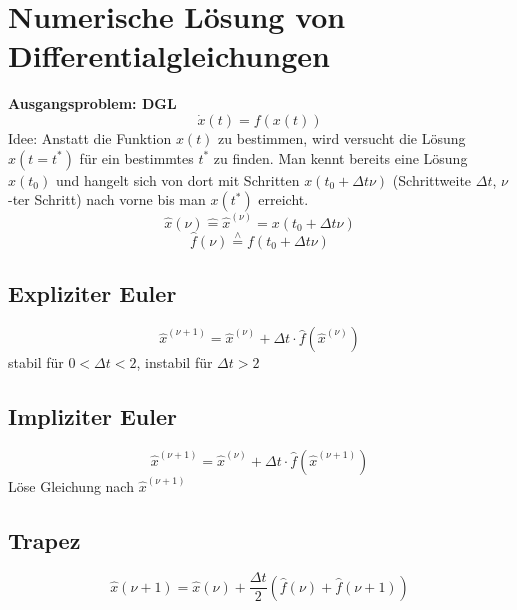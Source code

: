 \documentclass[german]{latex4ei/latex4ei_sheet}
\begin{document}
\section{Numerische Lösung von Differentialgleichungen}
\begin{sectionbox}
\textbf{Ausgangsproblem: DGL}
\begin{equation*}
	\dot{x}(t) = f(x(t))
\end{equation*}
Idee: Anstatt die Funktion $x(t)$ zu bestimmen, wird versucht die Lösung $x(t=t^*)$ für ein bestimmtes $t^*$ zu finden. Man kennt bereits eine Lösung $x(t_0)$ und hangelt sich von dort mit Schritten $x(t_0 + Δtν)$ (Schrittweite $\Delta t$, $ν$-ter Schritt) nach vorne bis man $x(t^*)$ erreicht.
\begin{equation*}
	\hat{x}(\nu) \hat{=} \hat{x}^{(\nu)} = x(t_0 + \Delta t \nu)
\end{equation*}
\begin{equation*}
	\hat{f}(\nu) \stackrel{\wedge}{=} f(t_0 + \Delta t \nu)
\end{equation*}


\subsection{Expliziter Euler}
\begin{equation*}
	\hat{x}^{(\nu + 1)} = \hat{x}^{(\nu)} + \Delta t \cdot \hat{f}\left(\hat{x}^{(\nu)}\right)
\end{equation*}
stabil für $0 < Δt < 2$, instabil für $Δt > 2$
\subsection{Impliziter Euler}
\begin{equation*}
	\hat{x}^{(\nu + 1)} = \hat{x}^{(\nu)} + \Delta t \cdot \hat{f}\left(\hat{x}^{(\nu + 1)}\right)
\end{equation*}
Löse Gleichung nach $\hat{x}^{(\nu + 1)} $

\subsection{Trapez}
\begin{equation*}
	\hat{x}(\nu + 1) = \hat{x}(\nu) + \frac{\Delta t}{2} (\hat{f}(\nu) + \hat{f}(\nu + 1))
\end{equation*}
\end{sectionbox}
\end{document}
